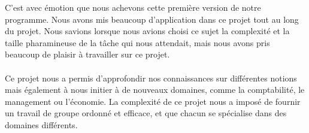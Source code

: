 C'est avec émotion que nous achevons cette première version de notre programme. Nous avons mis beaucoup d'application dans ce projet tout au long du projet. Nous savions lorsque nous avions choisi ce sujet la complexité et la taille pharamineuse de la tâche qui nous attendait, mais nous avons pris beaucoup de plaisir à travailler sur ce projet.\\
\\
Ce projet nous a permis d'approfondir nos connaissances sur différentes notions mais également à nous initier à de nouveaux domaines, comme la comptabilité, le management ou l'économie. La complexité de ce projet nous a imposé de fournir un travail de groupe ordonné et efficace, et que chacun se spécialise dans des domaines différents.

